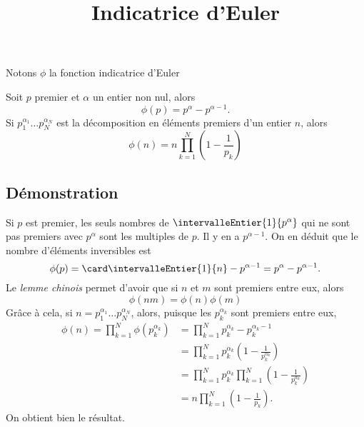 \documentclass[fontsize=12pt,twoside=false,parskip=half, french]{scrartcl}
\title{Indicatrice d’Euler}
\date{}
\author{}
\begin{document}
\maketitle
   Notons $\phi$ la fonction indicatrice d’Euler 
   \begin{Theoreme}
      Soit $p$ premier et $\alpha$ un entier non nul, alors
      \[
         \phi(p) = p^\alpha - p^{\alpha - 1}. 
      \]
      Si $p_1^{\alpha_1} \ldots p_N^{\alpha_N}$ est la décomposition en éléments
      premiers d’un entier $n$, alors
      \[
         \phi(n) = n \prod_{k = 1}^N \left(1 - \frac{1}{p_k}\right)
      \]
   \end{Theoreme}
   \subsection{Démonstration}
      Si $p$ est premier, les seuls nombres de $\intervalleEntier{1}{p^\alpha}$
      qui ne sont pas premiers avec $p^\alpha$ sont les multiples de $p$. Il y 
      en a $p^{\alpha - 1}$. On en déduit que le nombre d’éléments inversibles est
      \[
         \phi(p) = \card \intervalleEntier{1}{n} - p^{\alpha - 1} = p^\alpha - 
         p^{\alpha - 1}.
      \]
      Le \emph{lemme chinois} permet d’avoir que si $n$ et $m$
      sont premiers entre eux, alors
      \[
         \phi(nm) = \phi(n)\phi(m) 
      \]
      Grâce à cela, si $n = p_1^{\alpha_1} \ldots p_N^{\alpha_N}$, alors,
      puisque les $p_k^{\alpha_k}$ sont premiers entre eux,
      \begin{align*}
         \phi(n) = \prod_{k = 1}^N \phi(p_k^{\alpha_k})
                 &= \prod_{k = 1}^N p_k^{\alpha_k} - p_k^{\alpha_k - 1}\\
                 &= \prod_{k = 1}^N p_k^{\alpha_k} \left(1 - \frac{1}{p_k^{\alpha_k}}\right)\\
                 &= \prod_{k = 1}^N p_k^{\alpha_k} \prod_{k = 1}^N\left(1 - \frac{1}{p_k^{\alpha_k}}\right)\\
                 &= n \prod_{k = 1}^N \left(1 - \frac{1}{p_k}\right).
      \end{align*}
      On obtient bien le résultat.
\end{document}
